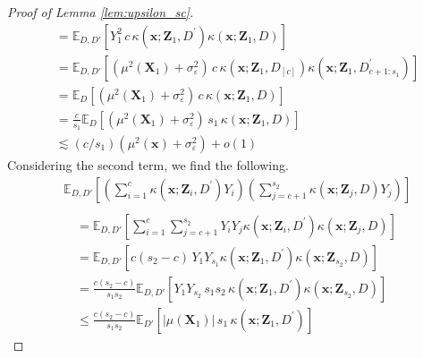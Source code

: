 \documentclass[letterpaper,10pt]{article}
\numberwithin{equation}{section}
\numberwithin{thm}{section}
\numberwithin{lem}{section}
\numberwithin{cor}{section}
\newcommand{\E}{\mathbb{E}}
\newcommand{\1}{\mathbbm{1}}
\begin{document}
\begin{proof}[Proof of Lemma \ref{lem:upsilon_sc}]
\begin{equation}
\begin{aligned}
			 & = \E_{D, D'}\left[Y_{1}^2 \, c \, \kappa(\mathbf{x}; \mathbf{Z}_1, D^{\prime})\kappa(\mathbf{x}; \mathbf{Z}_1, D)\right]                                                                     \\
			 & = \E_{D, D'}\left[\left(\mu^2(\mathbf{X}_{1}) + \sigma^2_{\varepsilon}\right) \, c \, \kappa(\mathbf{x}; \mathbf{Z}_1, D_{[c]})\kappa(\mathbf{x}; \mathbf{Z}_1, D^{\prime}_{c+1:s_1})\right] \\
			 & = \E_{D}\left[\left(\mu^2(\mathbf{X}_{1}) + \sigma^2_{\varepsilon}\right) \, c \, \kappa(\mathbf{x}; \mathbf{Z}_1, D)\right]                                                                 \\
			 & = \frac{c}{s_1} \E_{D}\left[\left(\mu^2(\mathbf{X}_{1}) + \sigma^2_{\varepsilon}\right) \, s_1 \, \kappa(\mathbf{x}; \mathbf{Z}_1, D)\right]                                                 \\
			 & \lesssim (c/s_1)(\mu^2(\mathbf{x}) + \sigma^2_{\varepsilon}) + o(1)
		\end{aligned}
	\end{equation}
	Considering the second term, we find the following.
	\begin{equation}
		\begin{aligned}
			 & \E_{D, D'}\left[\left(\sum_{i = 1}^{c}\kappa(\mathbf{x}; \mathbf{Z}_i, D^{\prime}) Y_i\right)
			\left(\sum_{j = c+1}^{s_2} \kappa(\mathbf{x}; \mathbf{Z}_j, D) Y_j\right)\right]                                                                                          \\                                                                                                                                                                         \\
			 & \quad = \E_{D, D'}\left[\sum_{i = 1}^{c}\sum_{j = c+1}^{s_2}Y_i Y_j \kappa(\mathbf{x}; \mathbf{Z}_i, D^{\prime})\kappa(\mathbf{x}; \mathbf{Z}_j, D)\right]             \\
			 & \quad = \E_{D, D'}\left[c(s_2 - c) \, Y_1 Y_{s_1} \kappa(\mathbf{x}; \mathbf{Z}_1, D^{\prime})\kappa(\mathbf{x}; \mathbf{Z}_{s_2}, D)\right]                           \\
			 & \quad = \frac{c (s_2 - c)}{s_1 s_2}\E_{D, D'}\left[Y_1 Y_{s_2} \, s_1 s_2 \,\kappa(\mathbf{x}; \mathbf{Z}_1, D^{\prime})\kappa(\mathbf{x}; \mathbf{Z}_{s_2}, D)\right] \\
			 & \quad \leq \frac{c (s_2 - c)}{s_1 s_2}
			\E_{D'}\left[|\mu(\mathbf{X}_1)| \, s_1  \,\kappa(\mathbf{x}; \mathbf{Z}_1, D^{\prime})\right]

\end{aligned}
\end{equation}
\end{proof}
\end{document}
